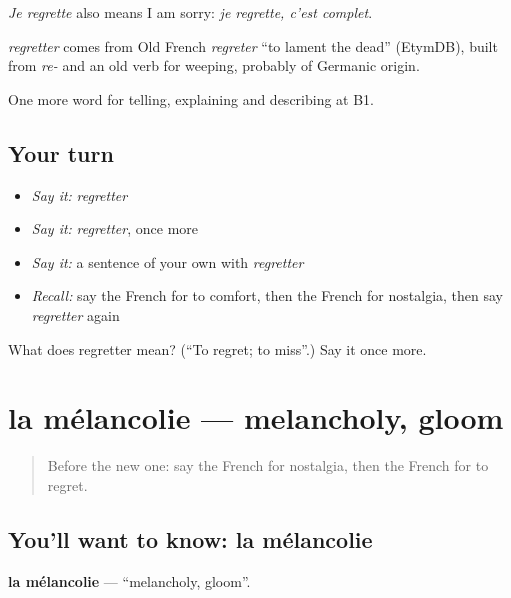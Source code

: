 \emph{Je regrette} also means I am sorry: \emph{je regrette, c'est complet}.

\begin{cousinweb}
\emph{regretter} comes from Old French \emph{regreter} \textquotedblleft{}to lament the dead\textquotedblright{} (EtymDB), built from \emph{re-} and an old verb for weeping, probably of Germanic origin.
\end{cousinweb}

\begin{grammarlens}[title={What you've built}]
One more word for telling, explaining and describing at B1.
\end{grammarlens}

\subsection*{Your turn}
\begin{itemize}
\raggedright
  \item \emph{Say it:} \emph{regretter}
  \item \emph{Say it:} \emph{regretter}, once more
  \item \emph{Say it:} a sentence of your own with \emph{regretter}
  \item \emph{Recall:} say the French for to comfort, then the French for nostalgia, then say \emph{regretter} again
\end{itemize}

\begin{tcolorbox}[breakable,colback=teal!4,colframe=teal!35!black,title={Before you move on}]
What does regretter mean? (\textquotedblleft{}To regret; to miss\textquotedblright{}.) Say it once more.
\end{tcolorbox}
\section[la mélancolie]{la mélancolie — melancholy, gloom}

\label{lesson:FR-C472-melancolie}



\begin{quote}
Before the new one: say the French for nostalgia, then the French for to regret.
\end{quote}

\subsection*{You'll want to know: la mélancolie}
\textbf{la mélancolie} — \textquotedblleft{}melancholy, gloom\textquotedblright{}.

